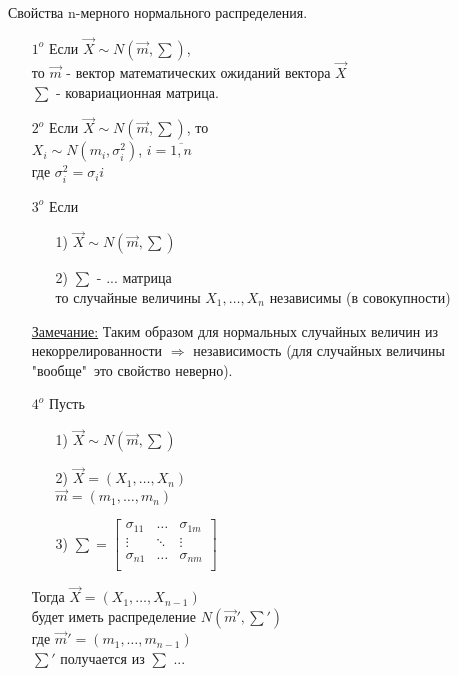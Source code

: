 Свойства n-мерного нормального распределения.\\
\begin{enumerate}
	\item[$1^o$] Если $\vec{X} \sim N(\vec{m}, \sum)$,\\
	то $\vec{m}$ - вектор математических ожиданий вектора $\vec{X}$\\
	$\sum$ - ковариационная матрица.
	
	\item[$2^o$] Если $\vec{X} \sim N(\vec{m}, \sum)$, то\\
	$X_i \sim N(m_i, \sigma_i^2)$, $i = \overline{1, n}$\\
	где $\sigma_i^2 = \sigma_ii$ %
	
	\item[$3^o$] Если\\
	\begin{enumerate}
		\item[1)] $\vec{X} \sim N(\vec{m}, \sum)$
		\item[2)] $\sum$ - ... матрица\\ %
		то случайные величины $X_1, \ldots, X_n$ независимы (в совокупности)
	\end{enumerate}
	
	\underline{Замечание:} Таким образом для нормальных случайных величин из некоррелированности $\Rightarrow$ независимость (для случайных величины "вообще"\ это свойство неверно).
	
	\item[$4^o$] Пусть\\
	\begin{enumerate}
		\item[1)] $\vec{X} \sim N(\vec{m}, \sum)$
		\item[2)] $\vec{X} = (X_1, \ldots, X_n)$\\
		$\vec{m} = (m_1, \ldots, m_n)$
		\item[3)] $\sum = 
		\begin{bmatrix}
			\sigma_{11}	&	\dots		&	\sigma_{1m}	\\
			\vdots			&	\ddots	&	\vdots			\\
			\sigma_{n1}	&	\dots		&	\sigma_{nm}	\\
		\end{bmatrix}$\\
	\end{enumerate}
	Тогда
	$\vec{X} = (X_1, \ldots, X_{n - 1})$\\
	будет иметь распределение $N(\vec{m}', \sum')$\\
	где $\vec{m}' = (m_1, \ldots, m_{n - 1})$\\
	$\sum'$ получается из $\sum$ ... %
	

\end{enumerate}
